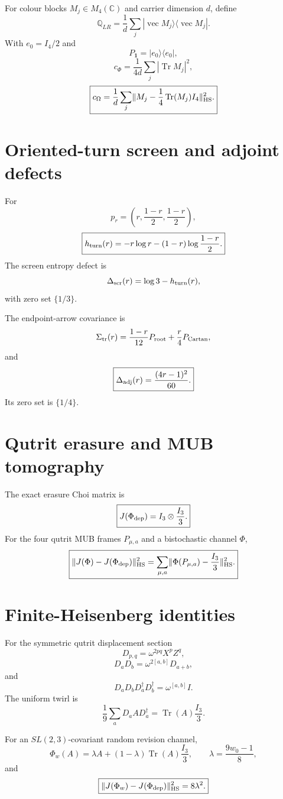 \documentclass[11pt,oneside,openany]{book}
\numberwithin{equation}{chapter}
\theoremstyle{definition}
\theoremstyle{remark}
\newcommand{\C}{\mathbb C}
\newcommand{\Tr}{\operatorname{Tr}}
\newcommand{\Qocc}{\mathbb Q_{LR}}
\newcommand{\norm}[1]{\lVert #1\rVert}
\newcommand{\vect}{\operatorname{vec}}
\begin{document}
For colour blocks \(M_j\in M_4(\C)\) and carrier dimension \(d\), define
\[
 \Qocc
 =
 \frac1d\sum_j|\vect M_j\rangle\langle\vect M_j|.
\]
With \(e_0=I_4/2\) and
\[
 P_{\mathbf1}=|e_0\rangle\langle e_0|,
\]
\[
 \boxed{
 c_\Phi
 =
 \frac1{4d}\sum_j|\Tr M_j|^2,}
\]
\[
 \boxed{
 c_\Omega
 =
 \frac1d
 \sum_j
 \norm{
 M_j-\frac14\Tr(M_j)I_4
 }_{\rm HS}^2.}
\]

\section{Oriented-turn screen and adjoint defects}

For
\[
 p_r=
 \left(
 r,\frac{1-r}{2},\frac{1-r}{2}
 \right),
\]
\[
 \boxed{
 h_{\rm turn}(r)
 =
 -r\log r-(1-r)\log\frac{1-r}{2}.}
\]
The screen entropy defect is
\[
 \Delta_{\rm scr}(r)=\log3-h_{\rm turn}(r),
\]
with zero set \(\{1/3\}\).

The endpoint-arrow covariance is
\[
 \Sigma_{\rm tr}(r)
 =
 \frac{1-r}{12}P_{\rm root}
 +
 \frac r4P_{\rm Cartan},
\]
and
\[
 \boxed{
 \Delta_{\rm adj}(r)
 =
 \frac{(4r-1)^2}{60}.}
\]
Its zero set is \(\{1/4\}\).

\section{Qutrit erasure and MUB tomography}

The exact erasure Choi matrix is
\[
 \boxed{
 J(\Phi_{\rm dep})
 =
 I_3\otimes\frac{I_3}{3}.}
\]
For the four qutrit MUB frames \(P_{\mu,a}\) and a bistochastic channel
\(\Phi\),
\[
 \boxed{
 \norm{
 J(\Phi)-J(\Phi_{\rm dep})
 }_{\rm HS}^2
 =
 \sum_{\mu,a}
 \norm{
 \Phi(P_{\mu,a})-\frac{I_3}{3}
 }_{\rm HS}^2.}
\]

\section{Finite-Heisenberg identities}

For the symmetric qutrit displacement section
\[
 D_{p,q}
 =
 \omega^{2pq}X^pZ^q,
\]
\[
 \boxed{
 D_aD_b
 =
 \omega^{2[a,b]}D_{a+b},}
\]
and
\[
 \boxed{
 D_aD_bD_a^\dagger D_b^\dagger
 =
 \omega^{[a,b]}I.}
\]
The uniform twirl is
\[
 \boxed{
 \frac19\sum_aD_aAD_a^\dagger
 =
 \Tr(A)\frac{I_3}{3}.}
\]

For an \(SL(2,3)\)-covariant random revision channel,
\[
 \Phi_w(A)
 =
 \lambda A+(1-\lambda)\Tr(A)\frac{I_3}{3},
 \qquad
 \lambda=\frac{9w_0-1}{8},
\]
and
\[
 \boxed{
 \norm{
 J(\Phi_w)-J(\Phi_{\rm dep})
 }_{\rm HS}^2
 =
 8\lambda^2.}
\]
\end{document}
